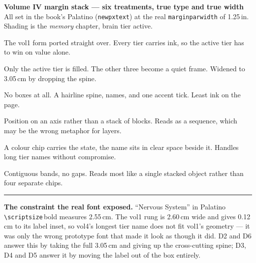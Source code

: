 \documentclass[11pt]{book}
\begin{document}
\thispagestyle{empty}
{\large\bfseries Volume IV margin stack --- six treatments, true type and true width}\\[2pt]
{\footnotesize All set in the book's Palatino (\texttt{newpxtext}) at the real
\texttt{marginparwidth} of 1.25\,in. Shading is the \emph{memory} chapter, brain tier active.}

\vspace{9mm}
\newcommand{\slot}[3]{\begin{minipage}[t][5.6cm][t]{3.55cm}%
  #1\par\vspace{3mm}{\footnotesize\bfseries #2}\par
  {\fontsize{7}{8.6}\selectfont #3}\end{minipage}}
\noindent
\slot{\dOne}{D1 Filled ladder}{The vol1 form ported straight over. Every tier
carries ink, so the active tier has to win on value alone.}\hfill
\slot{\dTwo}{D2 Outline, one active}{Only the active tier is filled. The other
three become a quiet frame. Widened to 3.05\,cm by dropping the spine.}\hfill
\slot{\dThree}{D3 Rule and text}{No boxes at all. A hairline spine, names, and one
accent tick. Least ink on the page.}

\vspace{6mm}
\noindent
\slot{\dFour}{D4 Lollipop axis}{Position on an axis rather than a stack of
blocks. Reads as a sequence, which may be the wrong metaphor for layers.}\hfill
\slot{\dFive}{D5 Chip and label}{A colour chip carries the state, the name sits
in clear space beside it. Handles long tier names without compromise.}\hfill
\slot{\dSix}{D6 Solid column}{Contiguous bands, no gaps. Reads most like a single
stacked object rather than four separate chips.}

\vspace{4mm}
\noindent\rule{\textwidth}{0.4pt}\par\vspace{2mm}
{\footnotesize\textbf{The constraint the real font exposed.} ``Nervous System''
in Palatino \texttt{\textbackslash scriptsize}\,bold measures 2.55\,cm. The vol1
rung is 2.60\,cm wide and gives 0.12\,cm to its label inset, so vol4's longest
tier name does not fit vol1's geometry --- it was only the wrong prototype font
that made it look as though it did. D2 and D6 answer this by taking the full
3.05\,cm and giving up the cross-cutting spine; D3, D4 and D5 answer it by moving
the label out of the box entirely.}
\end{document}
